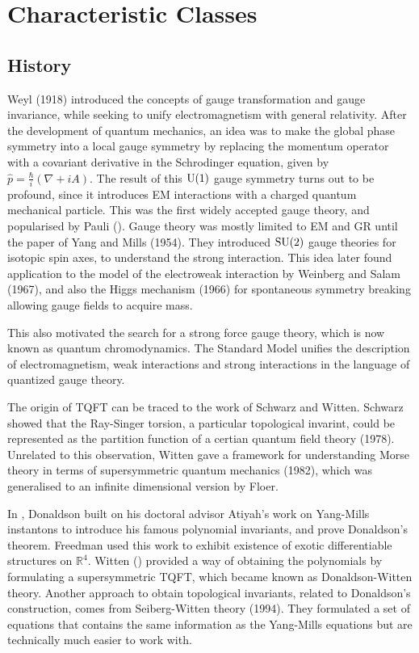
\chapter{Characteristic Classes}
\label{chapter1}
\section{History}
Weyl (1918) introduced the concepts of gauge transformation and gauge
invariance, while seeking to unify electromagnetism with general relativity. After the
development of quantum mechanics, an idea was to make the global phase symmetry
into a local gauge symmetry by replacing the momentum operator with a covariant 
derivative in the Schrodinger equation, given by 
$\widehat{p}=\frac{\hbar}{i}(\nabla+iA)$. The result of this $\operatorname{U}(1)$ gauge symmetry
turns out to be profound, since it introduces EM interactions with a charged
quantum mechanical particle. This was the first widely accepted gauge theory,
and popularised by Pauli (\citeyear{pauli_em}).\cite{pauli_em}
Gauge theory was mostly limited to EM and GR until the paper of Yang and Mills 
(1954). They introduced $\operatorname{SU}(2)$ gauge theories for
isotopic spin axes, to understand the strong interaction. This idea later found
application to the model of the electroweak interaction by Weinberg and Salam
(1967), and also the Higgs mechanism (1966) for spontaneous symmetry breaking
allowing gauge fields to acquire mass. 

This also motivated the search for a strong force gauge theory, which is now
known as quantum chromodynamics. The Standard Model unifies the description of
electromagnetism, weak interactions and strong interactions in the language of
quantized gauge theory. 

The origin of TQFT can be traced to the work of Schwarz and Witten.
Schwarz showed that the Ray-Singer torsion, a particular topological invarint,
could be represented as the partition function of a certian quantum field theory
(1978). Unrelated to this observation, Witten gave a framework for understanding
Morse theory in terms of supersymmetric quantum mechanics (1982), which was 
generalised to an infinite dimensional version by Floer. 

In \citeyear{don83}, Donaldson built on his doctoral advisor Atiyah's work on 
Yang-Mills instantons to introduce his famous polynomial invariants, and prove 
Donaldson's theorem.\cite{don83}
Freedman used this work to exhibit existence of exotic differentiable
structures on $\mathbb{R}^{4}$. 
Witten (\citeyear{wittenTQFT}) provided a way
of obtaining the polynomials by formulating a supersymmetric TQFT, which became
known as Donaldson-Witten theory.\cite{wittenTQFT}
Another approach to obtain topological invariants, related to Donaldson's
construction, comes from Seiberg-Witten theory (1994). They formulated a set of
equations that contains the same information as the Yang-Mills equations but
are technically much easier to work with. 

